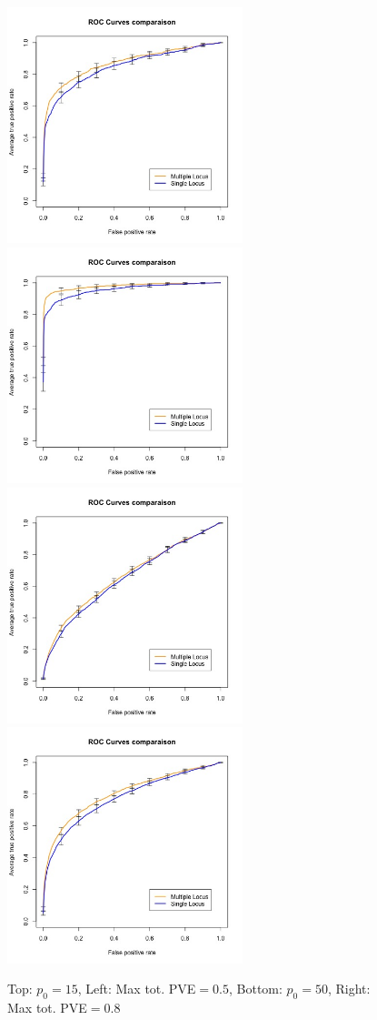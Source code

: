 \documentclass{article}
\begin{document}
\begin{figure}
\includegraphics[width=2.7in]{images/ROC_Comp_p0_15_var_0_5.jpeg}
\includegraphics[width=2.7in]{images/ROC_Comp_p0_15_var_0_8.jpeg}
\includegraphics[width=2.7in]{images/ROC_Comp_p0_50_var_0_5.jpeg}
\includegraphics[width=2.7in]{images/ROC_Comp_p0_50_var_0_8.jpeg}
\caption{Top: $p_0 = 15$, Left: Max tot. PVE$ = 0.5$,
Bottom: $p_0 = 50$, Right: Max tot. PVE$ = 0.8$}
\end{figure}
\newpage
%
%
\end{document}
